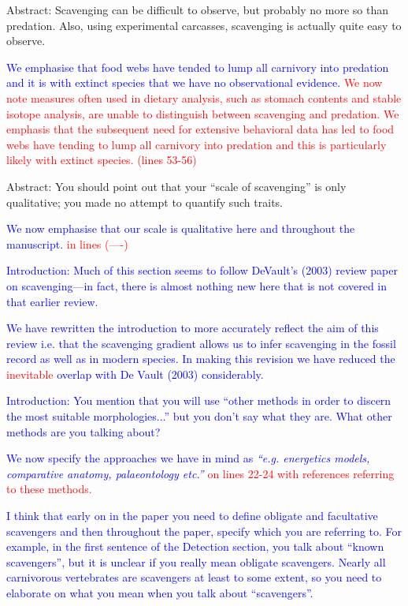 \documentclass[12pt,letterpaper]{article}
\begin{document}
\begin{enumerate}
\item{Abstract: Scavenging can be difficult to observe, but probably no more so than predation.
Also, using experimental carcasses, scavenging is actually quite easy to observe.}

\textcolor{blue}{We emphasise that food webs have tended to lump all carnivory into predation and it is with extinct species that we have no observational evidence.}
 \textcolor{red}{We now note measures often used in dietary analysis, such as stomach contents and stable isotope analysis, are unable to distinguish between scavenging and predation. We emphasis that the subsequent need for extensive behavioral data has led to food webs have tending to lump all carnivory into predation and this is particularly likely with extinct species. (lines 53-56)}


\item{Abstract: You should point out that your ``scale of scavenging'' is only qualitative; you made no attempt to quantify such traits.}

\textcolor{blue}{We now emphasise that our scale is qualitative here and throughout the manuscript.\textcolor{red}{ in lines (----)} 

\item{Introduction: Much of this section seems to follow DeVault's (2003) review paper on scavenging—in fact, there is almost nothing new here that is not covered in that earlier review.}

\textcolor{blue}{We have rewritten the introduction to more accurately reflect the aim of this review i.e. that the scavenging gradient allows us to infer scavenging in the fossil record as well as in modern species. In making this revision we have reduced the \textcolor{red}{inevitable} overlap with De Vault (2003) considerably.} %

\item{Introduction: You mention that you will use ``other methods in order to discern the most suitable morphologies...''  but you don't say what they are. What other methods are you talking about?}

\textcolor{blue}{We now specify the approaches we have in mind as \textit{``e.g. energetics models, comparative anatomy, palaeontology etc.''}} \textcolor{red}{on lines 22-24 with references referring to these methods.}




\item{I think that early on in the paper you need to define obligate and facultative scavengers and then throughout the paper, specify which you are referring to. For example, in the first sentence of the Detection section, you talk about ``known scavengers'', but it is unclear if you really mean obligate scavengers. Nearly all carnivorous vertebrates are scavengers at least to some extent, so you need to elaborate on what you mean when you talk about ``scavengers''.}

}
\end{enumerate}
\end{document}
